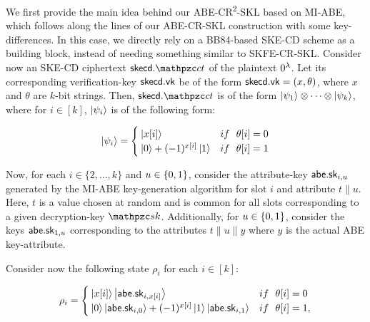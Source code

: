 We first provide the main idea
behind our ABE-CR\textsuperscript{2}-SKL based on MI-ABE, which follows along the lines of our
ABE-CR-SKL construction with some key-differences.
In this case, we directly rely on a BB84-based SKE-CD scheme as a
building block, instead of needing something similar to SKFE-CR-SKL.
Consider now an SKE-CD ciphertext $\skecd.\qct$ of the plaintext $0^\lambda$.
Let its corresponding verification-key $\mathsf{skecd}.\mathsf{vk}$ be of the form
$\mathsf{skecd}.\mathsf{vk} = (x,
\theta)$, where $x$ and $\theta$ are $k$-bit strings. Then, $\skecd.\qct$ is
of the form $\ket{\psi_1} \otimes \cdots \otimes \ket{\psi_k}$, where
for $i \in [k]$, $\ket{\psi_i}$ is of the following form:

\begin{align}
\ket{\psi_i}=
\begin{cases}
    \ket{x[i]} & if~~ \theta[i]=0\\
    \ket{0}+(-1)^{x[i]}\ket{1} & if~~ \theta[i]=1
\end{cases}
\end{align}

Now, for each $i \in \{2, \dots, k\}$ and $u \in \{0,1\}$, consider the attribute-key
$\mathsf{abe}.\mathsf{sk}_{i, u}$ generated by the MI-ABE key-generation
algorithm for slot $i$ and attribute $t \| u$. Here, $t$ is a value chosen at
random and is common for all slots corresponding to a given decryption-key
$\qsk$. Additionally, for $u \in \{0,1\}$, consider the keys
$\mathsf{abe}.\mathsf{sk}_{1,u}$ corresponding to the attributes $t \| u \| y$ where
$y$ is the actual ABE key-attribute.

Consider now the following state $\rho_i$ for each $i \in [k]$:

\begin{align}
    \rho_i=
    \begin{cases}
        \ket{x[i]}\ket{\mathsf{abe}.\mathsf{sk}_{i,x[i]}} & if~~ \theta[i]=0\\
        \ket{0}\ket{\mathsf{abe}.\mathsf{sk}_{i,0}}+(-1)^{x[i]}\ket{1}\ket{\mathsf{abe}.\mathsf{sk}_{i,1}} & if~~ \theta[i]=1,
    \end{cases}
\end{align}

